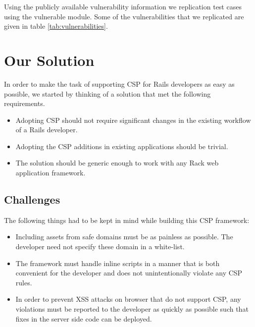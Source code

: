 \documentclass[10pt, conference, compsocconf]{IEEEtran}
\begin{document}
Using the publicly available vulnerability information we replication test cases using the vulnerable module. Some of the vulnerabilities that we replicated are given in table \ref{tab:vulnerabilities}.


\section{Our Solution} %
\label{sec:our_solution}
In order to make the task of supporting CSP for Rails developers as easy as possible, we started by thinking of a solution that met the following requirements.
\begin{itemize}

	\item Adopting CSP should not require significant changes in the existing workflow of a Rails developer.

	\item Adopting the CSP additions in existing applications should be trivial.

	\item The solution should be generic enough to work with any Rack web application framework.
\end{itemize}

\subsection{Challenges} %
\label{sub:challenges}
The following things had to be kept in mind while building this CSP framework:
\begin{itemize}

	\item Including assets from safe domains must be as painless as possible. The developer need not specify these domain in a white-list.

	\item The framework must handle inline scripts in a manner that is both convenient for the developer and does not unintentionally violate any CSP rules.

	\item In order to prevent XSS attacks on browser that do not support CSP, any violations must be reported to the developer as quickly as possible such that fixes in the server side code can be deployed.
\end{itemize}
\end{document}
